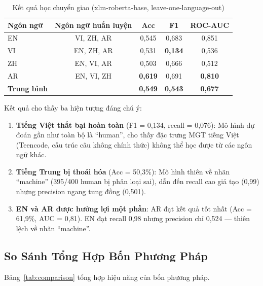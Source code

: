 \begin{table}[h]
\centering
\caption{Kết quả học chuyển giao (xlm-roberta-base, leave-one-language-out)}
\label{tab:transfer}
\begin{tabular}{lcccc}
\toprule
\textbf{Ngôn ngữ} & \textbf{Ngôn ngữ huấn luyện} & \textbf{Acc}
    & \textbf{F1} & \textbf{ROC-AUC} \\
\midrule
EN & VI, ZH, AR & 0,545 & 0,683 & 0,851 \\
VI & EN, ZH, AR & 0,531 & \textbf{0,134} & 0,536 \\
ZH & EN, VI, AR & 0,503 & 0,666 & 0,512 \\
AR & EN, VI, ZH & \textbf{0,619} & 0,691 & \textbf{0,810} \\
\midrule
\textbf{Trung bình} & & \textbf{0,549} & \textbf{0,543} & \textbf{0,677} \\
\bottomrule
\end{tabular}
\end{table}

Kết quả cho thấy ba hiện tượng đáng chú ý:

\begin{enumerate}
    \item \textbf{Tiếng Việt thất bại hoàn toàn} (F1 = 0,134, recall = 0,076):
    Mô hình dự đoán gần như toàn bộ là ``human'', cho thấy đặc trưng
    MGT tiếng Việt (Teencode, cấu trúc câu không chính thức) không thể
    học được từ các ngôn ngữ khác.

    \item \textbf{Tiếng Trung bị thoái hóa} (Acc = 50,3\%): Mô hình thiên
    về nhãn ``machine'' (395/400 human bị phân loại sai), dẫn đến recall
    cao giả tạo (0,99) nhưng precision ngang tung đồng (0,501).

    \item \textbf{EN và AR được hưởng lợi một phần}: AR đạt kết quả tốt
    nhất (Acc = 61,9\%, AUC = 0,81). EN đạt recall 0,98 nhưng precision
    chỉ 0,524 --- thiên lệch về nhãn ``machine''.
\end{enumerate}

\subsection{So Sánh Tổng Hợp Bốn Phương Pháp}

Bảng~\ref{tab:comparison} tổng hợp hiệu năng của bốn phương pháp.

